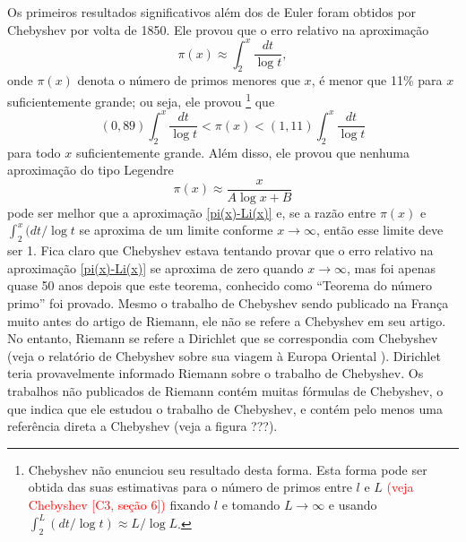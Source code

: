     Os primeiros resultados significativos além dos de Euler foram obtidos por Chebyshev por volta de 1850. Ele provou que o erro relativo na aproximação
    \begin{equation}
        \label{pi(x)-Li(x)}
        \pi(x) \approx \int_{2}^{x} \frac{dt}{\log t},
    \end{equation}
    onde $\pi(x)$ denota o número de primos menores que $x$, é menor que 11\% para $x$ suficientemente grande; ou seja, ele provou
    \footnote{
    Chebyshev não enunciou seu resultado desta forma. Esta forma pode ser obtida das suas estimativas para o número de primos entre $l$ e $L$ \textcolor{red}{(veja Chebyshev [C3, seção 6])} fixando $l$ e tomando $L \to \infty$ e usando $\int_{2}^{L}(dt/\log t) \approx L/\log L$.}
    que
    \begin{equation*}
        (0,89)\int_{2}^{x} \frac{dt}{\log t} < \pi(x) < (1,11)\int_{2}^{x} \frac{dt}{\log t}
    \end{equation*}
    para todo $x$ suficientemente grande. Além disso, ele provou que nenhuma aproximação do tipo Legendre
    $$ \pi(x) \approx \frac{x}{A\log x + B} $$
    pode ser melhor que a aproximação \eqref{pi(x)-Li(x)} e, 
    se a razão entre $\pi(x)$ e 
    $\int_{2}^{x} (dt/\log t$ se aproxima de um limite conforme $x \to \infty$, 
    então esse limite deve ser 1. Fica claro que Chebyshev estava tentando 
    provar que o erro relativo na aproximação \eqref{pi(x)-Li(x)} 
    se aproxima de zero quando $x \to \infty$, mas foi apenas 
    quase 50 anos depois que este teorema, conhecido como 
    ``Teorema do número primo'' foi provado. 
    Mesmo o trabalho de Chebyshev sendo publicado na França muito antes 
    do artigo de Riemann, ele não se refere a Chebyshev em seu artigo. 
    No entanto, Riemann se refere a Dirichlet que 
    {\red se correspondia com} Chebyshev 
    (veja o relatório de Chebyshev sobre sua viagem à Europa Oriental 
    {\red [C5, Vol. 5...]}). 
    Dirichlet teria provavelmente informado Riemann sobre o trabalho de Chebyshev. 
    Os trabalhos não publicados de Riemann contém muitas fórmulas de Chebyshev, 
    o que indica que ele estudou o trabalho de Chebyshev, 
    e contém pelo menos uma referência direta a Chebyshev {\red(veja a figura ???)}.
    
